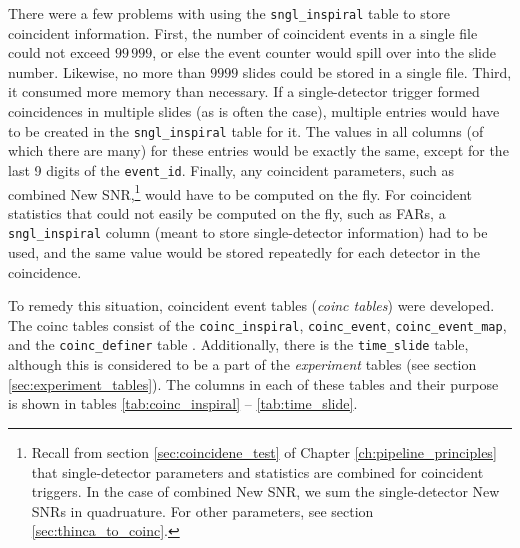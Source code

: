 There were a few problems with using the \texttt{sngl\_inspiral} table to store
coincident information. First, the number of coincident events in a single file
could not exceed $99\,999$, or else the event counter would spill over into the
slide number. Likewise, no more than $9999$ slides could be stored in a single
file. Third, it consumed more memory than necessary. If a single-detector
trigger formed coincidences in multiple slides (as is often the case), multiple
entries would have to be created in the \texttt{sngl\_inspiral} table for it.
The values in all columns (of which there are many) for these entries would be
exactly the same, except for the last 9 digits of the \texttt{event\_id}.
Finally, any coincident parameters, such as combined New
\ac{SNR},\footnote{Recall from section \ref{sec:coincidene_test} of Chapter
\ref{ch:pipeline_principles} that single-detector parameters and statistics are
combined for coincident triggers. In the case of combined New \ac{SNR}, we sum
the single-detector New \acp{SNR} in quadruature. For other parameters, see
section \ref{sec:thinca_to_coinc}.} would have to be computed on the fly. For
coincident statistics that could not easily be computed on the fly, such as
\acp{FAR}, a \texttt{sngl\_inspiral} column (meant to store single-detector
information) had to be used, and the same value would be stored repeatedly for
each detector in the coincidence.

To remedy this situation, coincident event tables (\emph{coinc tables}) were
developed. The coinc tables consist of the \texttt{coinc\_inspiral},
\texttt{coinc\_event}, \texttt{coinc\_event\_map}, and the
\texttt{coinc\_definer} table \cite{Cannon:CoincTables}. Additionally, there is
the \texttt{time\_slide} table, although this is considered to be a part of the
\emph{experiment} tables (see section \ref{sec:experiment_tables}). The columns
in each of these tables and their purpose is shown in tables
\ref{tab:coinc_inspiral} -- \ref{tab:time_slide}.

